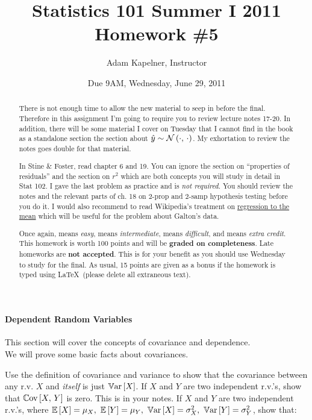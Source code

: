 \documentclass[12pt]{article}
\title{Statistics 101 Summer I 2011 \\ Homework \#5}
\author{Adam Kapelner, Instructor}
\date{Due 9AM, Wednesday, June 29, 2011}
\begin{document}
\maketitle


\begin{abstract}
There is not enough time to allow the new material to seep in before the final. Therefore in this assignment I'm going to require you to review lecture notes 17-20. In addition, there will be some material I cover on Tuesday that I cannot find in the book as a standalone section \ie the section about $\hat{y} \sim \mathcal{N}\left(\cdot,\,\cdot\right)$. My exhortation to review the notes goes double for that material.

In Stine \& Foster, read chapter 6 and 19. You can ignore the section on ``properties of residuals'' and the section on $r^2$ which are both concepts you will study in detail in Stat 102. I gave the last problem as practice and is \textit{not required}. You should review the notes and the relevant parts of ch. 18 on 2-prop and 2-samp hypothesis testing before you do it. I would also recommend to read Wikipedia's treatment on \href{http://en.wikipedia.org/wiki/Regression_toward_the_mean}{regression to the mean} which will be useful for the problem about Galton's data.

Once again,  means \textit{easy},  means \textit{intermediate},  means \textit{difficult}, and  means \textit{extra credit}. This homework is worth 100 points and will be \textbf{graded on completeness}. Late homeworks are \textbf{not accepted}. This is for your benefit as you should use Wednesday to study for the final. As usual, 15 points are given as a bonus if the homework is typed using \LaTeX ~(please delete all extraneous text).
\end{abstract}

\paragraph{Dependent Random Variables} This section will cover the concepts of covariance and dependence. \\

\problem We will prove some basic facts about covariances.

\benum
\easysubproblem Use the definition of covariance and variance to show that the covariance between any r.v. $X$ and \textit{itself} is just $\mathbb{V}\text{ar}\left[X\right]$.
\easysubproblem If $X$ and $Y$ are two independent r.v.'s, show that $\mathbb{C}\text{ov}\left[X,\,Y\right]$ is zero. This is in your notes.
\hardsubproblem If $X$ and $Y$ are two independent r.v.'s, where $\mathbb{E}\left[X\right] = \mu_X, ~\mathbb{E}\left[Y\right] = \mu_Y, ~\mathbb{V}\text{ar}\left[X\right] = \sigma^2_X, ~\mathbb{V}\text{ar}\left[Y\right] = \sigma^2_Y$, show that:
\end{document}
